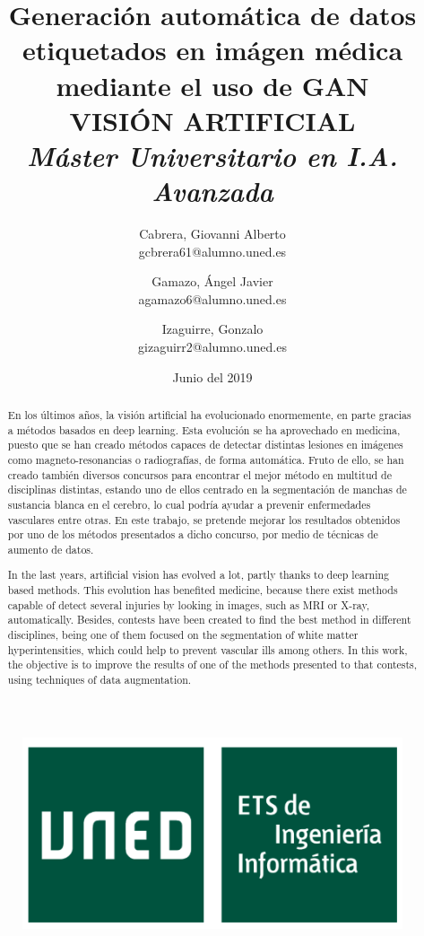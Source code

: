 \documentclass[spanish,a4paper, 11pt]{article}
\author{Cabrera, Giovanni Alberto\\ gcbrera61@alumno.uned.es \and Gamazo, Ángel Javier \\ agamazo6@alumno.uned.es  \and Izaguirre, Gonzalo \\ gizaguirr2@alumno.uned.es }
\title{\textbf{Generación automática de datos etiquetados en imágen médica mediante el uso de GAN}\\ VISIÓN ARTIFICIAL \\ \textit{Máster Universitario en I.A. Avanzada}}
\date{Junio del 2019}
\numberwithin{equation}{section}
\numberwithin{table}{section}
\numberwithin{figure}{section}
\begin{document}
\maketitle
\vspace{1 cm}
\begin{figure}[H]
	\centering
	\includegraphics[width=0.8\linewidth]{Logo.png}	
\end{figure}
\newpage


\begin{abstract}
En los últimos años, la visión artificial ha evolucionado enormemente, en parte gracias a métodos basados en deep learning. Esta evolución se ha aprovechado en medicina, puesto que se han creado métodos capaces de detectar distintas lesiones en imágenes como magneto-resonancias o radiografías, de forma automática. Fruto de ello, se han creado también diversos concursos para encontrar el mejor método en multitud de disciplinas distintas, estando uno de ellos centrado en la segmentación de manchas de sustancia blanca en el cerebro, lo cual podría ayudar a prevenir enfermedades vasculares entre otras. En este trabajo, se pretende mejorar los resultados obtenidos por uno de los métodos presentados a dicho concurso, por medio de técnicas de aumento de datos.
\end{abstract}
	
	
	\renewcommand{\abstractname}{\textit{Abstract}}
	
\begin{abstract}
In the last years, artificial vision has evolved a lot, partly thanks to deep learning based methods. This evolution has benefited medicine, because there exist methods capable of detect several injuries by looking in images, such as MRI or X-ray, automatically. Besides, contests have been created to find the best method in different disciplines, being one of them focused on the segmentation of white matter hyperintensities, which could help to prevent vascular ills among others. In this work, the objective is to improve the results of one of the methods presented to that contests, using techniques of data augmentation.
\end{abstract}
\newpage
\tableofcontents
\newpage
\end{document}
